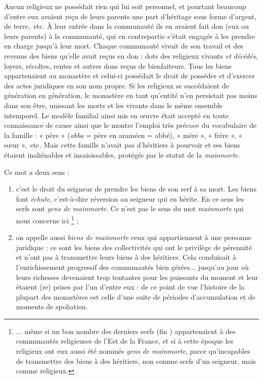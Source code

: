  Aucun religieux ne possédait rien qui lui soit personnel, et pourtant beaucoup d'entre eux avaient reçu de leurs parents une part d'héritage sous forme d'argent, de terre,~etc. À leur entrée dans la communauté ils en avaient fait don (eux ou leurs parents) à la communauté, qui en contrepartie s'était engagée à les prendre en charge jusqu'à leur mort. Chaque communauté vivait de son travail et des revenus des biens qu'elle avait reçus en don : dots des religieux vivants \emph{et décédés}, loyers, récoltes, rentes et autres dons reçus de bienfaiteurs. Tous les biens appartenaient au monastère et celui-ci possédait le droit de posséder et d'exercer des actes juridiques en son nom propre. Si les religieux se succédaient de génération en génération, le monastère en tant qu'entité n'en persistait pas moins dans son être, unissant les morts et les vivants dans le même ensemble intemporel. Le modèle familial ainsi mis en œuvre était accepté en toute connaissance de cause ainsi que le montre l'emploi très précoce du vocabulaire de la famille : « père » (\emph{abba} = père en araméen = abbé), « mère », « frère », « sœur »,~etc. Mais cette famille n'avait pas d'héritiers à pourvoir et ses biens étaient inaliénables et insaisissables, protégés par le statut de la \emph{mainmorte}. 
 
 Ce mot a deux sens :
\begin{enumerate}
\item c'est le droit du seigneur de prendre les biens de son serf à sa mort. Les biens font \emph{échute}, c'est-à-dire réversion au seigneur qui en hérite. En ce sens les serfs sont \emph{gens de mainmorte}. Ce n'est pas le sens du mot \emph{mainmorte} qui nous concerne ici%
\footnote{... même si un bon nombre des derniers serfs (fin ) appartenaient à des communautés religieuses de l'Est de la France, et si à cette époque les religieux ont eux aussi été nommés \emph{gens de mainmorte}, parce qu'incapables de transmettre des biens à des héritiers, non comme serfs d'un seigneur, mais comme religieux.}
 ;
\item on appelle aussi \emph{biens de mainmorte} ceux qui appartiennent à une personne juridique : ce sont les biens des collectivités qui ont le privilège de pérennité et n'ont pas à transmettre leurs biens à des héritiers. Cela conduisait à l'enrichissement progressif des communautés bien gérées... jusqu'au jour où leurs richesses devenaient trop tentantes pour les puissants du moment et leur étaient (re) prises par l'un d'entre eux : de ce point de vue l'histoire de la plupart des monastères est celle d'une suite de périodes d'accumulation et de moments de spoliation.
\end{enumerate} 

